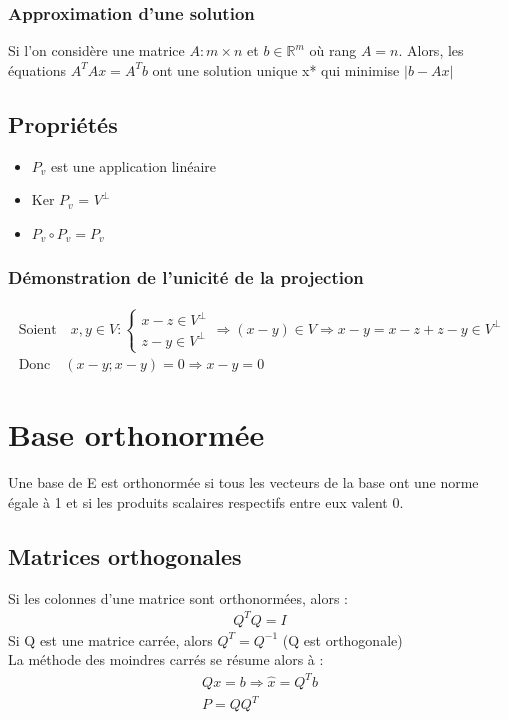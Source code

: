 \documentclass[a4paper]{book}
\begin{document}
\subsubsection{Approximation d'une solution}
Si l'on considère une matrice $A : m\times n$ et $b \in \mathbb{R}^m$ où rang $A = n$. Alors, les équations $A^TAx = A^Tb$ ont une solution unique x* qui minimise $|b-Ax|$
\subsection{Propriétés}
\begin{itemize}
    \item $P_v$ est une application linéaire
    \item Ker $P_v$ = $V^\perp$
    \item $P_v \circ P_v = P_v$
\end{itemize}
\subsubsection{Démonstration de l'unicité de la projection}
\begin{gather}
    \text{Soient} \quad x,y \in V : 
        \begin{cases}
        x-z \in V^\perp \\
        z-y \in V^\perp
        \end{cases}
    \Rightarrow (x-y) \in V \Rightarrow x-y = x-z + z-y \in V^\perp \\
    \text{Donc} \quad (x-y;x-y) = 0 \Rightarrow x-y = 0
\end{gather}
\section{Base orthonormée}
Une base de E est orthonormée si tous les vecteurs de la base ont une norme égale à 1 et si les produits scalaires respectifs entre eux valent 0.
\subsection{Matrices orthogonales}
Si les colonnes d'une matrice sont orthonormées, alors :
\begin{gather}
    Q^TQ = I
\end{gather}
Si Q est une matrice carrée, alors $Q^T = Q^{-1}$ (Q est orthogonale) \\
La méthode des moindres carrés se résume alors à :
\begin{gather}
    Qx=b \Rightarrow \hat{x} = Q^Tb \\
    P = QQ^T
\end{gather}
\end{document}

